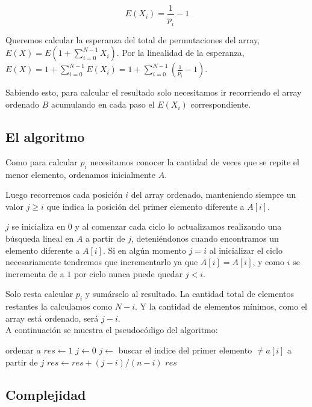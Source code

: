 $$
E(X_i) = \frac{1}{p_i} - 1
$$

Queremos calcular la esperanza del total de permutaciones del array, $E(X) = E(1 + \sum_{i=0}^{N-1} X_i)$.
Por la linealidad de la esperanza, $E(X) = 1 + \sum_{i=0}^{N-1} E(X_i) = 1 + \sum_{i=0}^{N-1} (\frac{1}{p_i} - 1)$.

Sabiendo esto, para calcular el resultado solo necesitamos ir recorriendo el array ordenado $B$
acumulando en cada paso el $E(X_i)$ correspondiente.

\subsection{El algoritmo}

Como para calcular $p_i$ necesitamos conocer la cantidad de veces que se repite el menor elemento,
ordenamos inicialmente $A$.

Luego recorremos cada posición $i$ del array ordenado,
manteniendo siempre un valor $j \geq i$ que indica la posición del primer elemento diferente a $A[i]$.

$j$ se inicializa en 0 y al comenzar cada ciclo lo actualizamos realizando una búsqueda lineal
en $A$ a partir de $j$, deteniéndonos cuando encontramos un elemento diferente a $A[i]$.
Si en algún momento $j = i$ al inicializar el ciclo necesariamente tendremos que incrementarlo ya que $A[i] = A[i]$, y como $i$ se incrementa de a $1$ por ciclo nunca puede quedar $j<i$.

Solo resta calcular $p_i$ y sumárselo al resultado. La cantidad total de elementos restantes la calculamos como $N - i$. Y la cantidad de elementos mínimos, como el array está ordenado, será $j - i$.
\\

A continuación se muestra el pseudocódigo del algoritmo:

\newpage

\begin{algorithmic}

    \State ordenar $a$
    \State $res \gets 1$
    \State $j \gets 0$
        \State $j \gets$ buscar el indice del primer elemento $\neq a[i]$ a partir de $j$
        \State $res \gets res + (j-i)/(n-i)$
    \EndFor
    \State \Return $res$
\EndFunction

\end{algorithmic}

\subsection{Complejidad}

